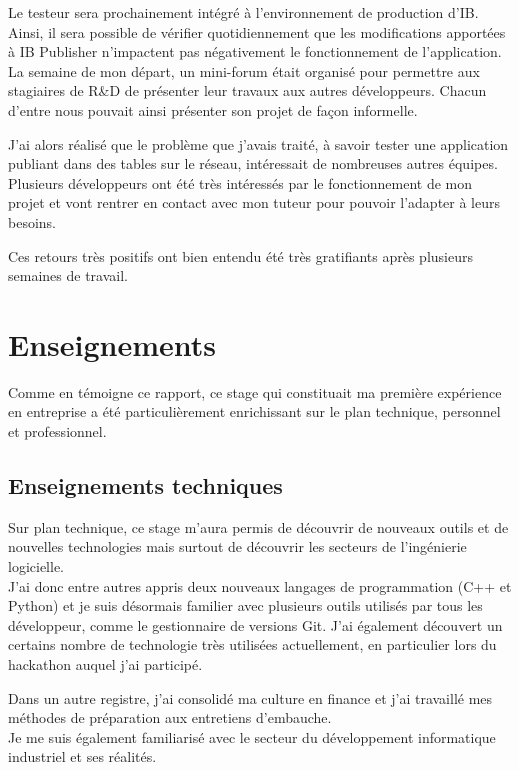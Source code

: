 \documentclass[11pt, oneside, titlepage, a4paper]{article}
\begin{document}
Le testeur sera prochainement intégré à l'environnement de production d'IB. Ainsi, il sera possible de vérifier quotidiennement que les modifications apportées à IB Publisher n'impactent pas négativement le fonctionnement de l'application.
\\

La semaine de mon départ, un mini-forum était organisé pour permettre aux stagiaires de R\&D de présenter leur travaux aux autres développeurs. Chacun d'entre nous pouvait ainsi présenter son projet de façon informelle.

J'ai alors réalisé que le problème que j'avais traité, à savoir tester une application publiant dans des tables sur le réseau, intéressait de nombreuses autres équipes. Plusieurs développeurs ont été très intéressés par le fonctionnement de mon projet et vont rentrer en contact avec mon tuteur pour pouvoir l'adapter à leurs besoins.

Ces retours très positifs ont bien entendu été très gratifiants après plusieurs semaines de travail.
\newpage
\section{Enseignements}
Comme en témoigne ce rapport, ce stage qui constituait ma première expérience en entreprise a été particulièrement enrichissant sur le plan technique, personnel et professionnel. 
	\subsection{Enseignements techniques}
Sur plan technique, ce stage m'aura permis de découvrir de nouveaux outils et de nouvelles technologies mais surtout de découvrir les secteurs de l'ingénierie logicielle.
\\

J'ai donc entre autres appris deux nouveaux langages de programmation (C++ et Python) et je suis désormais familier avec plusieurs outils utilisés par tous les développeur, comme le gestionnaire de versions Git. J'ai également découvert un certains nombre de technologie très utilisées actuellement, en particulier lors du hackathon auquel j'ai participé.

Dans un autre registre, j'ai consolidé ma culture en finance et j'ai travaillé mes méthodes de préparation aux entretiens d'embauche.
\\

Je me suis également familiarisé avec le secteur du développement informatique industriel et ses réalités.
\end{document}
